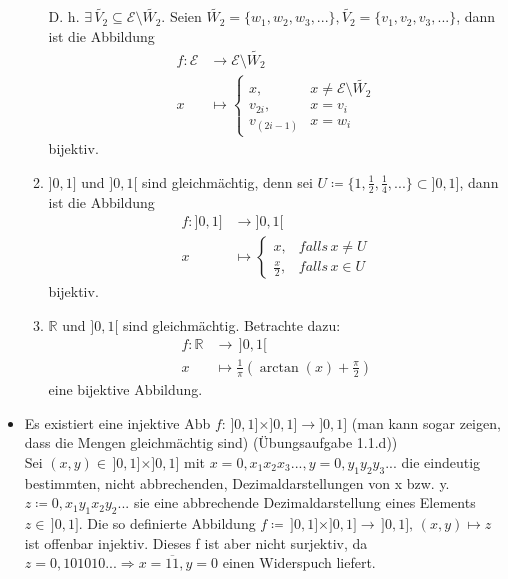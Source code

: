 \begin{itemize}[noitemsep]
\begin{enumerate}
	D. h. $\exists \, \widetilde{V_2} \subseteq \mathcal{E}\setminus\widetilde{W_2}$. Seien $\widetilde{W_2} = \{w_1, w_2, w_3, ...\}, \widetilde{V_2} = \{v_1, v_2, v_3,...\}$, dann ist die Abbildung
	\begin{equation*}
		\begin{aligned}
			f\colon \mathcal{E} & \to \mathcal{E}\setminus\widetilde{W_2}\\
			x & \mapsto
		\left\{
		\begin{matrix}
			x, & x \ne \mathcal{E}\setminus\widetilde{W_2}\\
			v_{2i}, & x = v_i\\
			v_{(2i-1)} & x = w_i
		\end{matrix}
		\right .
		\end{aligned}
	\end{equation*}
	\raggedleft
	bijektiv.
	\raggedright
	\item $]0,1]$ und $]0,1[$ sind gleichmächtig, denn sei $U\coloneqq \{1,\frac{1}{2}, \frac{1}{4}, ...\} \subset ]0,1]$, dann ist die Abbildung
	\begin{equation*}
		\begin{aligned}
		f\colon ]0,1] &\to ]0,1[\\
		x & \mapsto
		\left\{
		\begin{matrix}
			x, & falls \, x \ne U\\
			\frac{x}{2}, & falls \, x \in U
		\end{matrix}
		\right .
		\end{aligned}
	\end{equation*}
		\raggedleft
		bijektiv.
		\raggedright		
	\item $\mathbb{R}$ und $]0,1[$ sind gleichmächtig. Betrachte dazu:
	\begin{equation*}
		\begin{aligned}
		f\colon \mathbb{R} &\to \, ]0,1[\\
		x &\mapsto \frac{1}{\pi} \left(\arctan(x) + \frac{\pi}{2}\right)
		\end{aligned}
	\end{equation*}
	\raggedleft
	eine bijektive Abbildung.
	\raggedright
\end{enumerate}
\item Es existiert eine injektive Abb $f\colon \, ]0,1]\times]0,1] \to ]0,1]$ (man kann sogar zeigen, dass die Mengen gleichmächtig sind) (Übungsaufgabe 1.1.d))\\
Sei $(x,y) \in \, ]0,1] \times ]0,1]$ mit $x = 0,x_1x_2x_3..., y= 0,y_1y_2y_3...$ die eindeutig bestimmten, nicht abbrechenden, Dezimaldarstellungen von x bzw. y. $z\coloneqq 0,x_1y_1x_2y_2...$ sie eine abbrechende Dezimaldarstellung eines Elements $z \in \, ]0,1]$. Die so definierte Abbildung $f\coloneqq \, ]0,1]\times]0,1] \to \, ]0,1], \, (x,y) \mapsto z$ ist offenbar injektiv. Dieses f ist aber nicht surjektiv, da $z = 0,101010... \Rightarrow x=\overline{11}, y = 0$ einen Widerspuch liefert.\\

\end{itemize}
